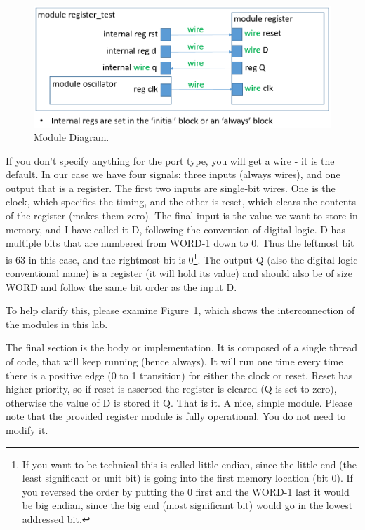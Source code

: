 \begin{figure}
	\caption{Module Diagram.}\label{fig:modulediagram}
	\begin{center}
		\includegraphics[width=4.75in]{../images/register_test_module_diagram.png}
	\end{center}
\end{figure}

If you don't specify anything for the port type, you will get a wire - it is the default.  In our case we have four signals: three inputs (always wires), and one output that is a register.  The first two inputs are single-bit wires.  One is the clock, which specifies the timing, and the other is reset, which clears the contents of the register (makes them zero).  The final input is the value we want to store in memory, and I have called it D, following the convention of digital logic.  D has multiple bits that are numbered from WORD-1 down to 0.  Thus the leftmost bit is 63 in this case, and the rightmost bit is 0\footnote{If you want to be technical this is called little endian, since the little end (the least significant or unit bit) is going into the first memory location (bit 0).  If you reversed the order by putting the 0 first and the WORD-1 last it would be big endian, since the big end (most significant bit) would go in the lowest addressed bit.}.  The output Q (also the digital logic conventional name) is a register (it will hold its value) and should also be of size WORD and follow the same bit order as the input D.

To help clarify this, please examine Figure~\ref{fig:modulediagram}, which shows the interconnection of the modules in this lab.

The final section is the body or implementation.  It is composed of a single thread of code, that will keep running (hence always).  It will run one time every time there is a positive edge (0 to 1 transition) for either the clock or reset.  Reset has higher priority, so if reset is asserted the register is cleared (Q is set to zero), otherwise the value of D is stored it Q.  That is it.  A nice, simple module.  Please note that the provided register module is fully operational.  You do not need to modify it.

